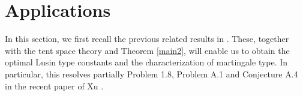 \documentclass[oneside,english,a4wide]{amsart}
\numberwithin{equation}{section}
\numberwithin{figure}{section}
\theoremstyle{plain}
\theoremstyle{plain}
\theoremstyle{definition}
\theoremstyle{plain}
\theoremstyle{remark}
\theoremstyle{definition}
\theoremstyle{remark}
\theoremstyle{definition}
\newcommand{\real}{{\mathbb R}}
\renewcommand{\L}{{\mathcal L}}
\newcommand{\8}{+\infty}
\renewcommand{\1}{\mathbbm{1}}
\newcommand\norm[1]{ \left\| #1 \right\| }
\newcommand\sk[1]{ \left( #1 \right) }
\newcommand{\lara}[1]{\left\langle #1 \right\rangle}
\renewcommand\d{{\rm d}}
\begin{document}
{%




\section{Applications}\label{Applications}
In this section, we first recall the previous related results in \cite{Ouyang2010, MTX}. These, together with the tent space theory and Theorem \ref{main2}, will enable us to obtain the optimal Lusin type constants and the characterization of martingale type. In particular, this resolves partially Problem 1.8, Problem A.1 and Conjecture A.4 in the recent paper of Xu \cite{Xu2021}. 

}
\end{document}
